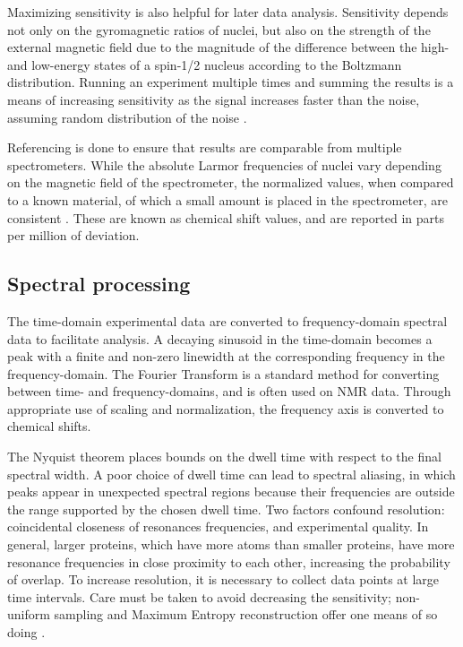 Maximizing sensitivity is also helpful for later data analysis.
Sensitivity depends not only on the gyromagnetic ratios of nuclei, but also
on the strength of the external magnetic field due to the magnitude of the
difference between the high- and low-energy states of a spin-1/2 nucleus
according to the Boltzmann distribution.
Running an experiment multiple times and summing the results is a 
means of increasing sensitivity as the signal increases faster
than the noise, assuming random distribution of the noise
\cite{ardenkjaer2003increase}.

Referencing is done to ensure that results are comparable from multiple
spectrometers.  While the absolute Larmor frequencies of nuclei vary depending
on the magnetic field of the spectrometer, the normalized values, when compared
to a known material, of which a small amount is placed in the spectrometer,
are consistent \cite{wishart19951h}.  These are known as chemical shift values,
and are reported in parts per million of deviation.

\subsection*{Spectral processing}

The time-domain experimental data are converted to frequency-domain spectral
data to facilitate analysis.  A decaying sinusoid in the time-domain becomes
a peak with a finite and non-zero linewidth at the corresponding frequency
in the frequency-domain.  The Fourier Transform \cite{cooley1965algorithm}
is a standard method for 
converting between time- and frequency-domains, and is often used on NMR data.
Through appropriate use of scaling and normalization, the frequency axis is
converted to chemical shifts.

The Nyquist theorem \cite{nyquist1928certain, shannon1949communication}
places bounds on the dwell time with respect to the 
final spectral width.  A poor choice of dwell time can lead to spectral 
aliasing, in which peaks appear in unexpected spectral regions because their
frequencies are outside the range supported by the chosen dwell time.
Two factors confound resolution:  coincidental
closeness of resonances frequencies, and experimental quality.  In general, 
larger proteins, which have more atoms than smaller proteins, have more resonance
frequencies in close proximity to each other, increasing the probability of 
overlap.  To increase resolution, it is necessary to collect data points at 
large time intervals.  Care must be taken to avoid decreasing the sensitivity;
non-uniform sampling and Maximum Entropy reconstruction offer one means of so
doing \cite{rovnyak2004accelerated, hoch1985maximum}.

